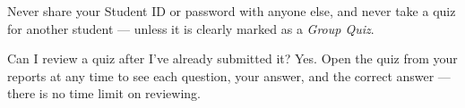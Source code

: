 \documentclass[12pt,a4paper]{article}
\begin{document}
\begin{warnbox}
Never share your Student ID or password with anyone else, and never take a
quiz for another student --- unless it is clearly marked as a \emph{Group Quiz}.
\end{warnbox}

\begin{qabox}{Can I review a quiz after I've already submitted it?}
Yes. Open the quiz from your reports at any time to see each question, your
answer, and the correct answer --- there is no time limit on reviewing.
\end{qabox}

\vspace{0.4cm}
\begin{center}
\begin{tcolorbox}[colback=eduBlue, colframe=eduBlue, arc=3mm, width=0.92\linewidth,
  left=4mm, right=4mm, top=2.5mm, bottom=2.5mm]
\end{tcolorbox}
\end{center}
\end{document}
